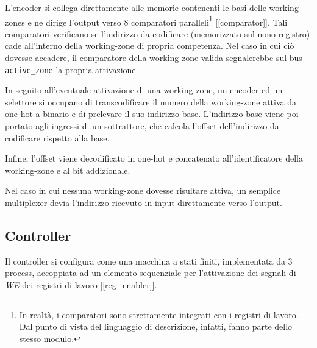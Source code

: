 \documentclass[11pt,a4paper]{article}
\begin{document}
L'encoder si collega direttamente alle memorie contenenti le basi delle working-zones e ne dirige l'output verso 8 comparatori paralleli\footnote{In
realtà, i comparatori sono strettamente integrati con i registri di lavoro. Dal punto di vista del linguaggio di descrizione, infatti, fanno parte dello
stesso modulo.} [\ref{comparator}]. Tali comparatori verificano se l'indirizzo da codificare (memorizzato sul nono registro) cade all'interno della
working-zone di propria competenza. Nel caso in cui ciò dovesse accadere, il comparatore della working-zone valida segnalerebbe sul bus
\lstinline{active_zone} la propria attivazione.

In seguito all'eventuale attivazione di una working-zone, un encoder ed un selettore si occupano di transcodificare il numero della working-zone attiva
da one-hot a binario e di prelevare il suo indirizzo base. L'indirizzo base viene poi portato agli ingressi di un sottrattore, che calcola l'offset
dell'indirizzo da codificare rispetto alla base.

Infine, l'offset viene decodificato in one-hot e concatenato all'identificatore della working-zone e al bit addizionale.

Nel caso in cui nessuna working-zone dovesse risultare attiva, un semplice multiplexer devia l'indirizzo ricevuto in input direttamente verso l'output.

\subsection{Controller}
Il controller si configura come una macchina a stati finiti, implementata da 3 process, accoppiata ad un elemento sequenziale per l'attivazione dei
segnali di \emph{WE} dei registri di lavoro [\ref{reg_enabler}].
\end{document}
